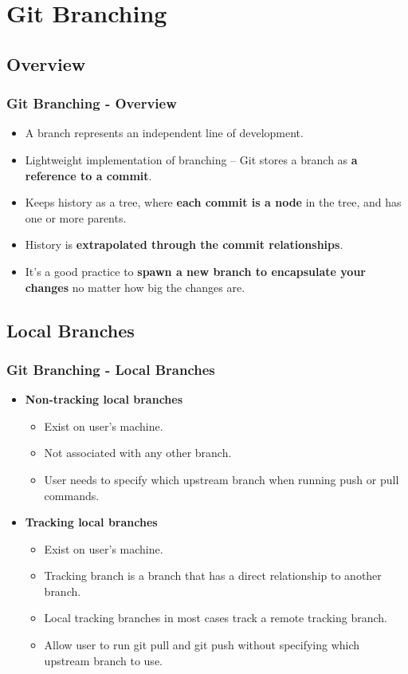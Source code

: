 \section[Git Branching]{Git Branching}
\subsection[]{Overview}
\begin{frame}
\frametitle{Git Branching - Overview}
\begin{itemize}
	\item A branch represents an independent line of development.
	\item Lightweight implementation of branching – Git stores a branch as \textbf{a reference to a commit}.
	\item Keeps history as a tree, where \textbf{each commit is a node} in the tree, and has one or more parents.
	\item History is \textbf{extrapolated through the commit relationships}.
	\item It’s a good practice to \textbf{spawn a new branch to encapsulate your changes} no matter how big the changes are.
\end{itemize}
\end{frame}



\subsection[]{Local Branches}
\begin{frame}
\frametitle{Git Branching - Local Branches}
\begin{itemize}
	\item \textbf{Non-tracking local branches}
		\begin{itemize}
		\item Exist on user’s machine.
		\item Not associated with any other branch.
		\item User needs to specify which upstream branch when running push or pull commands.
		\end{itemize}
	\item \textbf{Tracking local branches}
		\begin{itemize}
		\item Exist on user’s machine.
		\item Tracking branch is a branch that has a direct relationship to another branch.
		\item Local tracking branches in most cases track a remote tracking branch.
		\item Allow user to run git pull and git push without specifying which upstream branch to use.
		\end{itemize}
\end{itemize}
\end{frame}

